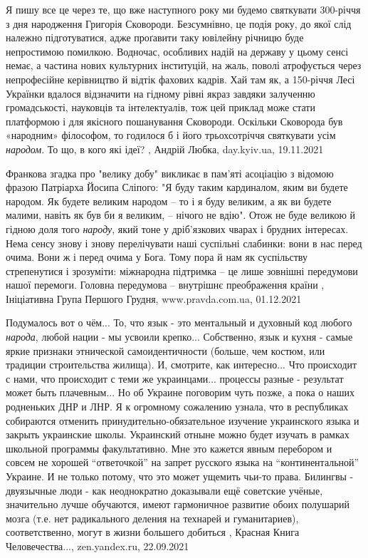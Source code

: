 Я пишу все це через те, що вже наступного року ми будемо святкувати 300-річчя з
дня народження Григорія Сковороди. Безсумнівно, це подія року, до якої слід
належно підготуватися, адже проґавити таку ювілейну річницю буде непростимою
помилкою. Водночас, особливих надій на державу у цьому сенсі немає, а частина
нових культурних інституцій, на жаль, поволі атрофується через непрофесійне
керівництво й відтік фахових кадрів. Хай там як, а 150-річчя Лесі Українки
вдалося відзначити на гідному рівні якраз завдяки залученню громадськості,
науковців та інтелектуалів, тож цей приклад може стати платформою і для
якісного пошанування Сковороди.  Оскільки Сковорода був «народним» філософом,
то годилося б і його трьохсотріччя святкувати усім \emph{народом}. То що, в
кого які ідеї?
, 
Андрій Любка, day.kyiv.ua, 19.11.2021

Франкова згадка про "велику добу" викликає в пам’яті асоціацію з відомою фразою
Патріарха Йосипа Сліпого: "Я буду таким кардиналом, яким ви будете народом. Як
будете великим народом – то і я буду великим, а як ви будете малими, навіть як
був би я великим, – нічого не вдію".  Отож не буде великою й гідною доля того
\emph{народу}, який тоне у дріб’язкових чварах і брудних інтересах.  Нема сенсу знову
і знову перелічувати наші суспільні слабинки: вони в нас перед очима. Вони ж і
перед очима у Бога. Тому пора й нам як суспільству стрепенутися і зрозуміти:
міжнародна підтримка – це лише зовнішні передумови нашої перемоги.  Головна
передумова – внутрішнє преображення країни
, 
Ініціативна Група Першого Грудня, www.pravda.com.ua, 01.12.2021

Подумалось вот о чём... То, что язык - это ментальный и духовный код любого
\emph{народа}, любой нации - мы усвоили крепко... Собственно, язык и кухня -
самые яркие признаки этнической самоидентичности (больше, чем костюм, или
традиции строительства жилища). И, смотрите, как интересно... Что происходит с
нами, что происходит с теми же украинцами... процессы разные - результат может
быть плачевным...  Но об Украине поговорим чуть позже, а пока о наших
родненьких ДНР и ЛНР. Я к огромному сожалению узнала, что в республиках
собираются отменить принудительно-обязательное изучение украинского языка и
закрыть украинские школы. Украинский отныне можно будет изучать в рамках
школьной программы факультативно. Мне это кажется явным перебором и совсем не
хорошей \enquote{ответочкой} на запрет русского языка на \enquote{континентальной} Украине. И
не только потому, что это может ущемить чьи-то права. Билингвы - двуязычные
люди - как неоднократно доказывали ещё советские учёные, значительно лучше
обучаются, имеют гармоничное развитие обоих полушарий мозга (т.е. нет
радикального деления на технарей и гуманитариев), соответственно, могут в жизни
большего добиться
, 
Красная Книга Человечества..., zen.yandex.ru, 22.09.2021
